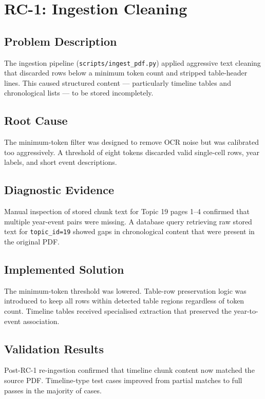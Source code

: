 \documentclass[12pt, a4paper]{report}
\newcommand{\codeinline}[1]{\texttt{#1}}
\begin{document}
\section{RC-1: Ingestion Cleaning}
\label{sec:rc1}

\subsection{Problem Description}

The ingestion pipeline (\codeinline{scripts/ingest\_pdf.py}) applied aggressive
text cleaning that discarded rows below a minimum token count and stripped
table-header lines. This caused structured content — particularly timeline
tables and chronological lists — to be stored incompletely.

\subsection{Root Cause}

The minimum-token filter was designed to remove OCR noise but was calibrated
too aggressively. A threshold of eight tokens discarded valid single-cell rows,
year labels, and short event descriptions.

\subsection{Diagnostic Evidence}

Manual inspection of stored chunk text for Topic 19 pages 1--4 confirmed that
multiple year-event pairs were missing. A database query retrieving raw stored
text for \codeinline{topic\_id=19} showed gaps in chronological content that
were present in the original PDF.

\subsection{Implemented Solution}

The minimum-token threshold was lowered. Table-row preservation logic was
introduced to keep all rows within detected table regions regardless of token
count. Timeline tables received specialised extraction that preserved the
year-to-event association.

\subsection{Validation Results}

Post-RC-1 re-ingestion confirmed that timeline chunk content now matched the
source PDF. Timeline-type test cases improved from partial matches to full
passes in the majority of cases.
\end{document}

